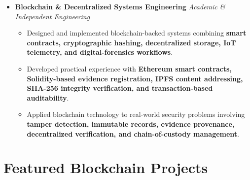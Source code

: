 \documentclass[a4paper,11pt]{article}
\newcommand{\resumeItem}[1]{
    \item \small{#1 \vspace{-2pt}}
}
\begin{document}
\begin{itemize}[leftmargin=0in, label={}]
\begin{itemize}[leftmargin=*]
\resumeItem{Selected for the \textbf{National Internship Program 2026 with SmartBridge}, gaining hands-on exposure to enterprise application development and workflow automation using the \textbf{Pega Platform}.}

\resumeItem{Developing practical knowledge of \textbf{Business Process Management (BPM), Case Management, Digital Process Automation (DPA), workflow orchestration, application configuration, and enterprise data integration}.}

\resumeItem{Applying structured enterprise software engineering practices involving \textbf{application lifecycle management, business process modeling, case lifecycle design, data integration, and secure enterprise application development}.}

\end{itemize}

\vspace{4pt}

\item
\textbf{Blockchain \& Decentralized Systems Engineering}
\hfill \textit{Academic \& Independent Engineering}

\begin{itemize}[leftmargin=*]

\resumeItem{Designed and implemented blockchain-backed systems combining \textbf{smart contracts, cryptographic hashing, decentralized storage, IoT telemetry, and digital-forensics workflows}.}

\resumeItem{Developed practical experience with \textbf{Ethereum smart contracts, Solidity-based evidence registration, IPFS content addressing, SHA-256 integrity verification, and transaction-based auditability}.}

\resumeItem{Applied blockchain technology to real-world security problems involving \textbf{tamper detection, immutable records, evidence provenance, decentralized verification, and chain-of-custody management}.}

\end{itemize}

\end{itemize}

\vspace{-10pt}



\section{Featured Blockchain Projects}
\end{document}
